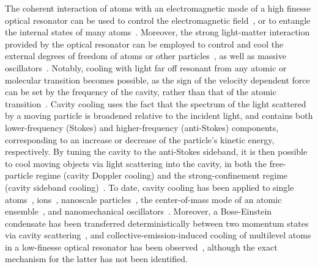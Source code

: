 \documentclass[aps,prl,superscriptaddress,onecloumn,nobibnotes]{revtex4-1}
\begin{document}
\maketitle

 The coherent interaction of atoms with an electromagnetic mode of a high finesse optical resonator can be used to control the electromagnetic field~\cite{kimblePRL1992,kimble:PS1998, Fushman:Sci:2008, Rempe:Nature2016, Rauschenbeutel:nphot:2014,Brooks2012}, or to entangle the internal states of many atoms~\cite{
 McConnell:Nature2015,Hosten:Nature2016,JThompson2011}. Moreover, the strong light-matter interaction provided by the optical resonator can be employed to control
 and cool the external degrees of freedom of atoms or other particles~\cite{Horak:PRL1997, VV:PRL2000,Rempe2006coolingPRA, Holland:PRL2016, VV:pra2001, Maunz:Nature2004, Ike:PRL2009, Monika:prl2011, Hemmerich:science, Chan:PRL2003,asenbaum2013cavity,millen2015cavity,kiesel2013cavity}, as well as massive oscillators~\cite{Marquardt2009,Metzger2004,Corbitt2007,Gigan2006,Arcizet2006,Schliesser2006,Thompson2008}. Notably, cooling with light far off resonant from any atomic or molecular transition becomes possible, as the sign of the velocity dependent force can be set by the frequency of the cavity, rather than that of the atomic transition~\cite{Horak:PRL1997, VV:PRL2000}. Cavity cooling uses the fact that the spectrum of the light scattered by a moving particle is broadened relative to the
  incident light, and contains both lower-frequency (Stokes) and higher-frequency (anti-Stokes) components, corresponding to an increase or decrease of the
  particle's kinetic energy, respectively. By tuning the cavity to the anti-Stokes sideband, it is then possible to cool moving objects via light scattering 
  into the cavity, in both the free-particle regime (cavity Doppler cooling) and the strong-confinement regime 
 (cavity sideband cooling)~\cite{VV:pra2001,Marquardt2007PRL}. To date, cavity cooling has been applied to single atoms~\cite{Maunz:Nature2004}, ions~\cite{Ike:PRL2009}, nanoscale particles~\cite{asenbaum2013cavity,millen2015cavity,kiesel2013cavity}, the center-of-mass mode of an atomic ensemble~\cite{ Monika:prl2011}, and nanomechanical oscillators~\cite{Marquardt2009,Metzger2004,Corbitt2007,Gigan2006,Arcizet2006,Schliesser2006,Thompson2008}. Moreover, a Bose-Einstein condensate has been transferred deterministically
 between two momentum states
via cavity scattering~\cite{Hemmerich:science}, and collective-emission-induced cooling of multilevel atoms in a low-finesse optical resonator has been
 observed~\cite{Chan:PRL2003}, although the exact mechanism for the latter has not been identified. \par
 
\end{document}
